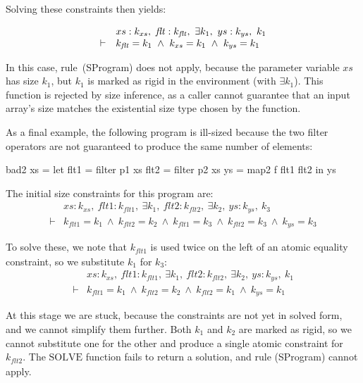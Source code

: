 Solving these constraints then yields:

$$
\begin{array}{ll}
       & xs : k_{xs},~ \mathit{flt} : k_{\mathit{flt}},~ \exists k_1,~ ys : k_{ys},~ k_1
\\
\vdash &          k_{\mathit{flt}}  = k_1
        ~\wedge~  k_{xs}   = k_1
        ~\wedge~  k_{ys}   = k_1
\end{array}
$$

In this case, rule~(SProgram) does not apply, because the parameter variable $xs$ has size $k_1$, but $k_1$ is marked as rigid in the environment (with $\exists k_1$). 
This function is rejected by size inference, as a caller cannot guarantee that an input array's size matches the existential size type chosen by the function.

As a final example, the following program is ill-sized because the two filter operators are not guaranteed to produce the same number of elements:
\begin{haskell}
bad2 xs
 = let flt1 = filter p1 xs
       flt2 = filter p2 xs
       ys   = map2   f  flt1 flt2
   in  ys
\end{haskell}

The initial size constraints for this program are:
\newcommand\flt{\textit{flt}}
$$
\begin{array}{ll}
       & xs : k_{xs},~ \flt1 : k_{\flt1},~ \exists k_1,~ \flt2 : k_{\flt2},~ \exists k_2,~ ys : k_{ys},~ k_3
\\
\vdash &          k_{\flt1}   = k_1
        ~\wedge~  k_{\flt2}   = k_2
        ~\wedge~  k_{\flt1}   = k_3
        ~\wedge~  k_{\flt2}   = k_3
        ~\wedge~  k_{ys}   = k_3
\end{array}
$$

To solve these, we note that $k_{\flt1}$ is used twice on the left of an atomic equality constraint, so we substitute $k_1$ for $k_3$:
$$
\begin{array}{ll}
       & xs : k_{xs},~ \flt1 : k_{\flt1},~ \exists k_1,~ \flt2 : k_{\flt2},~ \exists k_2,~ ys : k_{ys},~ k_1
\\
\vdash &          k_{\flt1}   = k_1
        ~\wedge~  k_{\flt2}   = k_2
        ~\wedge~  k_{\flt2}   = k_1
        ~\wedge~  k_{ys}   = k_1
\end{array}
$$

At this stage we are stuck, because the constraints are not yet in solved form, and we cannot simplify them further.
Both $k_1$ and $k_2$ are marked as rigid, so we cannot substitute one for the other and produce a single atomic constraint for $k_{\flt2}$.
The $\textrm{SOLVE}$ function fails to return a solution, and rule (SProgram) cannot apply.

